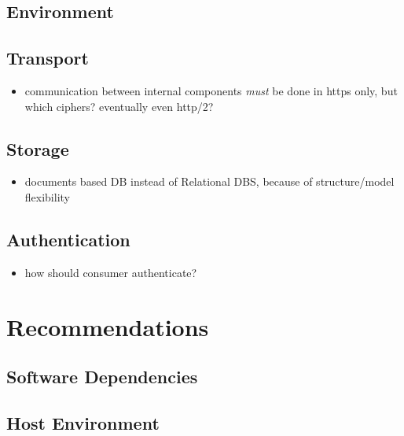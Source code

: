 \documentclass[12pt,english,a4paper,titlepage,cleardoublepage=empty,dottedtoc]{report}
\providecommand{\tightlist}{%
  \setlength{\itemsep}{0pt}\setlength{\parskip}{0pt}}
\begin{document}
\subsection{Environment}\label{environment}

\subsection{Transport}\label{transport}

\begin{itemize}
\tightlist
\item
  communication between internal components \emph{must} be done in https
  only, but which ciphers? eventually even http/2?
\end{itemize}

\subsection{Storage}\label{storage}

\begin{itemize}
\tightlist
\item
  documents based DB instead of Relational DBS, because of
  structure/model flexibility
\end{itemize}

\subsection{Authentication}\label{authentication-1}

\begin{itemize}
\tightlist
\item
  how should consumer authenticate?
\end{itemize}

\section{Recommendations}\label{recommendations}

\subsection{Software Dependencies}\label{software-dependencies}

\subsection{Host Environment}\label{host-environment}
\end{document}
